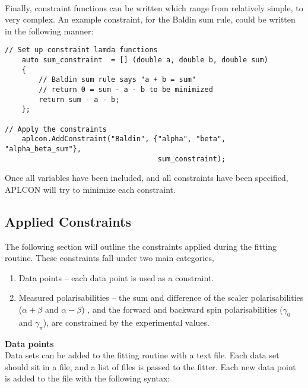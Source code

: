 \documentclass[]{article}
\begin{document}
\noindent \\Finally, constraint functions can be written which range from relatively simple, to very complex. An example constraint, for the Baldin sum rule, could be written in the following manner: \\

\begin{lstlisting}
// Set up constraint lamda functions
    auto sum_constraint  = [] (double a, double b, double sum)  
    {
	    // Baldin sum rule says "a + b = sum"
	    // return 0 = sum - a - b to be minimized
	    return sum - a - b;  
    };

// Apply the constraints
    aplcon.AddConstraint("Baldin", {"alpha", "beta", "alpha_beta_sum"},
								    sum_constraint);
\end{lstlisting}

\noindent Once all variables have been included, and all constraints have been specified, APLCON will try to minimize each constraint. 


\subsection{Applied Constraints}

The following section will outline the constraints applied during the fitting routine. These constraints fall under two main categories,

\begin{enumerate}
	\item Data points -- each data point is used as a constraint.
	\item Measured polarisabilities -- the sum and difference of the scaler polarisabilities ($\alpha+\beta$ and $\alpha-\beta$) , and the forward and backward spin polarisabilities ($\gamma_0$ and $\gamma_{\pi}$), are constrained by the experimental values.
\end{enumerate}

\vspace{3mm}

\noindent \textbf{Data points} \\

Data sets can be added to the fitting routine with a text file. Each data set should sit in a file, and a list of files is passed to the fitter. Each new data point is added to the file with the following syntax:
\end{document}
